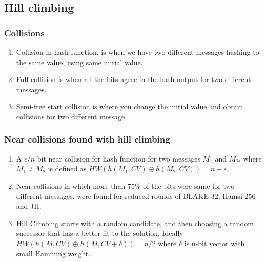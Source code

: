 \documentclass{beamer}
\begin{document}

\subsection{Hill climbing}

\begin{frame}
\frametitle{Collisions}
\begin{enumerate}
\item Collision in hash function, is when we have two different messages hashing to the same value, using
same initial value.
\item Full collision is when all the bits agree in the hash output for two different messages.
\item Semi-free start collision is where you change the initial value and obtain collisions for two 
different message.
\end{enumerate}
\end{frame}

\begin{frame}
\frametitle{Near collisions found with hill climbing}
\begin{enumerate}
\item A $\epsilon / n $ bit near collision for hash function for two messages $M_{1}$ and $M_{2}$, where 
$M_{1} \neq M_{2}$ is defined as $HW( h( M_{1}, CV ) \oplus h( M_{2}, CV ) ) = n - \epsilon $.
\item Near collisions in which more than 75\% of the bits were same for two different messages, were found 
for reduced rounds of BLAKE-32, Hamsi-256 and JH.
\item Hill Climbing starts with a random candidate, and then choosing a random successor that has a better
fit to the solution. Ideally $HW( h(M, CV) \oplus h(M, CV + \delta) ) = n / 2 $ where $\delta$ is n-bit 
vector with small Hamming weight.
\end{enumerate}
\end{frame}
\end{document}
